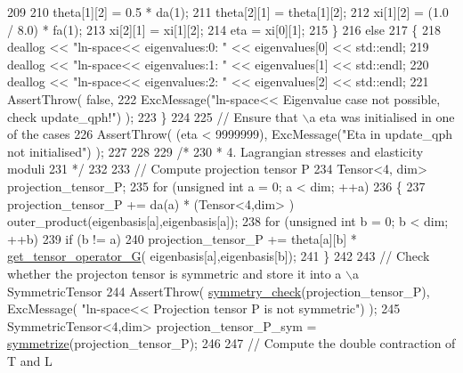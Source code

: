 \begin{DoxyCode}
209     
210             theta[1][2] = 0.5 * da(1);
211             theta[2][1] = theta[1][2];
212             xi[1][2] = (1.0 / 8.0) * fa(1);
213             xi[2][1] = xi[1][2];
214             eta = xi[0][1];
215          \}
216          \textcolor{keywordflow}{else}
217          \{
218             deallog << \textcolor{stringliteral}{"ln-space<< eigenvalues:0: "} << eigenvalues[0] << std::endl;
219             deallog << \textcolor{stringliteral}{"ln-space<< eigenvalues:1: "} << eigenvalues[1] << std::endl;
220             deallog << \textcolor{stringliteral}{"ln-space<< eigenvalues:2: "} << eigenvalues[2] << std::endl;
221             AssertThrow( \textcolor{keyword}{false},
222                          ExcMessage(\textcolor{stringliteral}{"ln-space<< Eigenvalue case not possible, check update\_qph!"}) );
223          \}
224     
225         \textcolor{comment}{// Ensure that \(\backslash\)a eta was initialised in one of the cases}
226          AssertThrow( (eta < 9999999), ExcMessage(\textcolor{stringliteral}{"Eta in update\_qph not initialised"}) );
227     
228     
229         \textcolor{comment}{/*}
230 \textcolor{comment}{         * 4. Lagrangian stresses and elasticity moduli}
231 \textcolor{comment}{         */}
232     
233         \textcolor{comment}{// Compute projection tensor P}
234          Tensor<4, dim> projection\_tensor\_P;
235          \textcolor{keywordflow}{for} (\textcolor{keywordtype}{unsigned} \textcolor{keywordtype}{int} a = 0; a < dim; ++a)
236          \{
237             projection\_tensor\_P += da(a) * (Tensor<4,dim> ) outer\_product(eigenbasis[a],eigenbasis[a]);
238             \textcolor{keywordflow}{for} (\textcolor{keywordtype}{unsigned} \textcolor{keywordtype}{int} b = 0; b < dim; ++b)
239                 \textcolor{keywordflow}{if} (b != a)
240                     projection\_tensor\_P += theta[a][b] * \hyperlink{functions_8h_a6e649771188b6d625bea6309e77fbd16}{get\_tensor\_operator\_G}(
      eigenbasis[a],eigenbasis[b]);
241          \}
242     
243         \textcolor{comment}{// Check whether the projecton tensor is symmetric and store it into a \(\backslash\)a SymmetricTensor}
244          AssertThrow( \hyperlink{functions_8h_aa37f13547b984cb066e2fcb530b36425}{symmetry\_check}(projection\_tensor\_P), ExcMessage( \textcolor{stringliteral}{"ln-space<< Projection
       tensor P is not symmetric"}) );
245          SymmetricTensor<4,dim> projection\_tensor\_P\_sym = \hyperlink{functions_8h_afe83e9509497294b7f662b800b6b91ff}{symmetrize}(projection\_tensor\_P);
246     
247         \textcolor{comment}{// Compute the double contraction of T and L}

\end{DoxyCode}

